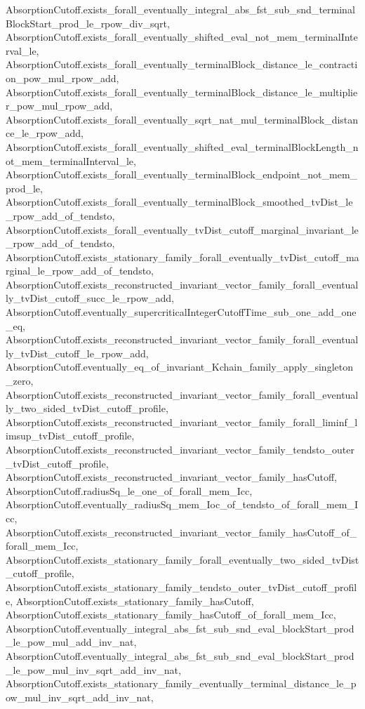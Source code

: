 \begin{lemma}
{    AbsorptionCutoff.exists_forall_eventually_integral_abs_fst_sub_snd_terminalBlockStart_prod_le_rpow_div_sqrt,
    AbsorptionCutoff.exists_forall_eventually_shifted_eval_not_mem_terminalInterval_le,
    AbsorptionCutoff.exists_forall_eventually_terminalBlock_distance_le_contraction_pow_mul_rpow_add,
    AbsorptionCutoff.exists_forall_eventually_terminalBlock_distance_le_multiplier_pow_mul_rpow_add,
    AbsorptionCutoff.exists_forall_eventually_sqrt_nat_mul_terminalBlock_distance_le_rpow_add,
    AbsorptionCutoff.exists_forall_eventually_shifted_eval_terminalBlockLength_not_mem_terminalInterval_le,
    AbsorptionCutoff.exists_forall_eventually_terminalBlock_endpoint_not_mem_prod_le,
    AbsorptionCutoff.exists_forall_eventually_terminalBlock_smoothed_tvDist_le_rpow_add_of_tendsto,
    AbsorptionCutoff.exists_forall_eventually_tvDist_cutoff_marginal_invariant_le_rpow_add_of_tendsto,
    AbsorptionCutoff.exists_stationary_family_forall_eventually_tvDist_cutoff_marginal_le_rpow_add_of_tendsto,
    AbsorptionCutoff.exists_reconstructed_invariant_vector_family_forall_eventually_tvDist_cutoff_succ_le_rpow_add,
    AbsorptionCutoff.eventually_supercriticalIntegerCutoffTime_sub_one_add_one_eq,
    AbsorptionCutoff.exists_reconstructed_invariant_vector_family_forall_eventually_tvDist_cutoff_le_rpow_add,
    AbsorptionCutoff.eventually_eq_of_invariant_Kchain_family_apply_singleton_zero,
    AbsorptionCutoff.exists_reconstructed_invariant_vector_family_forall_eventually_two_sided_tvDist_cutoff_profile,
    AbsorptionCutoff.exists_reconstructed_invariant_vector_family_forall_liminf_limsup_tvDist_cutoff_profile,
    AbsorptionCutoff.exists_reconstructed_invariant_vector_family_tendsto_outer_tvDist_cutoff_profile,
    AbsorptionCutoff.exists_reconstructed_invariant_vector_family_hasCutoff,
    AbsorptionCutoff.radiusSq_le_one_of_forall_mem_Icc,
    AbsorptionCutoff.eventually_radiusSq_mem_Ioc_of_tendsto_of_forall_mem_Icc,
    AbsorptionCutoff.exists_reconstructed_invariant_vector_family_hasCutoff_of_forall_mem_Icc,
    AbsorptionCutoff.exists_stationary_family_forall_eventually_two_sided_tvDist_cutoff_profile,
    AbsorptionCutoff.exists_stationary_family_tendsto_outer_tvDist_cutoff_profile,
    AbsorptionCutoff.exists_stationary_family_hasCutoff,
    AbsorptionCutoff.exists_stationary_family_hasCutoff_of_forall_mem_Icc,
    AbsorptionCutoff.eventually_integral_abs_fst_sub_snd_eval_blockStart_prod_le_pow_mul_add_inv_nat,
    AbsorptionCutoff.eventually_integral_abs_fst_sub_snd_eval_blockStart_prod_le_pow_mul_inv_sqrt_add_inv_nat,
    AbsorptionCutoff.exists_stationary_family_eventually_terminal_distance_le_pow_mul_inv_sqrt_add_inv_nat,
}
\end{lemma}

